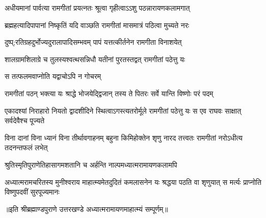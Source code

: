 \twolineshloka
{अधीयमानां पार्वत्या रामगीतां प्रयत्नतः}
{श्रूत्वा गृहीत्वाऽऽशु पठन्नारायणकलामगात्} %

\twolineshloka
{ब्रह्महत्यादिपापानां निष्कृतिं यदि वाञ्छति}
{रामगीतां मासमात्रं पठित्वा मुच्यते नरः} %

\twolineshloka
{दुष्प्;रतिग्रहदुर्भोज्यदुरालापादिसम्भवम्}
{पापं यत्तत्कीर्तनेन रामगीता विनाशयेत्} %

\twolineshloka
{शालग्रामशिलाग्रे च तुलस्यश्वत्थसन्निधौ}
{यतीनां पुरतस्तद्वत् रामगीतां पठेत्तु यः} %

\onelineshloka
{स तत्फलमवाप्नोति यद्वाचोऽपि न गोचरम्} %

\twolineshloka
{रामगीतां पठन् भक्त्या यः श्राद्धे भोजयेद्द्विजान्}
{तस्य ते पितरः सर्वे यान्ति विष्णोः परं पदम्} %

\threelineshloka
{एकादश्यां निराहारो नियतो द्वादशीदिने}
{स्थित्वाऽगस्त्यतरोर्मूले रामगीतां पठेत्तु यः}
{स एव राघवः साक्षात् सर्वदेवैश्च पूज्यते} %

\threelineshloka
{विना दानां विना ध्यानं विना तीर्थावगाहनम्}
{बहुना किमिहोक्तेन शृणु नारद तत्त्वतः}
{रामगीतां नरोऽधीत्य तदनन्तफलं लभेत्} %

\twolineshloka
{श्रुतिस्मृतिपुराणेतिहासागमशतानि च}
{अर्हन्ति नाल्पमध्यात्मरामायणकलामपि} %

\fourlineindentedshloka
{अध्यात्मरामचरितस्य मुनीश्वराय}
{माहात्म्यमेतदुदितं कमलासनेन}
{यः श्रद्धया पठति वा शृणुयात् स मर्त्यः}
{प्राप्नोति विष्णुपदवीं सुरपूज्यमानः} %

{॥इति श्रीब्रह्माण्डपुराणे उत्तरखण्डे अध्यात्मरामायणमाहात्म्यं सम्पूर्णम्॥
}

